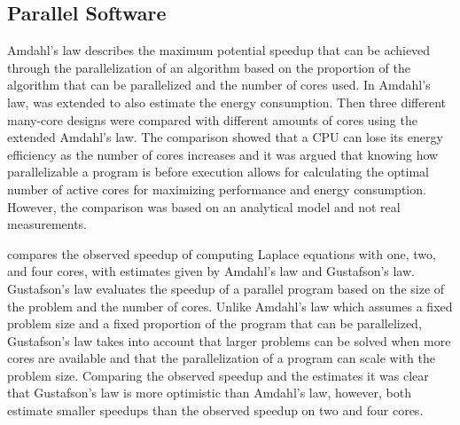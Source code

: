 \subsection{Parallel Software}

Amdahl's law describes the maximum potential speedup that can be achieved through the parallelization of an algorithm based on the proportion of the algorithm that can be parallelized and the number of cores used.\cite{amdahl1967validity} In \cite{woo2008extending} Amdahl's law, was extended to also estimate the energy consumption.  Then three different many-core designs were compared with different amounts of cores using the extended Amdahl's law. The comparison showed that a CPU can lose its energy efficiency as the number of cores increases and it was argued that knowing how parallelizable a program is before execution allows for calculating the optimal number of active cores for maximizing performance and energy consumption. However, the comparison was based on an analytical model and not real measurements.\cite{woo2008extending}

\cite{prinslow2011overview} compares the observed speedup of computing Laplace equations with one, two, and four cores, with estimates given by Amdahl's law and Gustafson's law.  Gustafson's law evaluates the speedup of a parallel program based on the size of the problem and the number of cores. Unlike Amdahl's law which assumes a fixed problem size and a fixed proportion of the program that can be parallelized, Gustafson's law takes into account that larger problems can be solved when more cores are available and that the parallelization of a program can scale with the problem size. Comparing the observed speedup and the estimates it was clear that Gustafson's law is more optimistic than Amdahl's law, however, both estimate smaller speedups than the observed speedup on two and four cores. \cite{prinslow2011overview}


